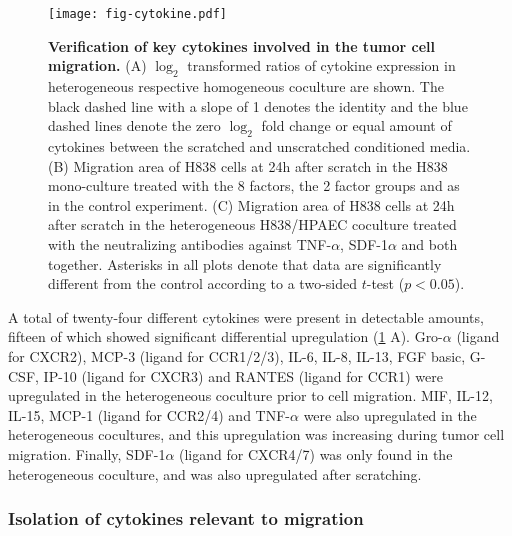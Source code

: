 \begin{figure}
\begin{center}
\texttt{[image: fig-cytokine.pdf]}
\end{center}
\caption[Verification of key cytokines]{
{\bf Verification of key cytokines involved in the tumor cell migration.} 
(A) $\log_2$ transformed ratios of cytokine expression in heterogeneous respective
homogeneous coculture are shown. The black dashed line with a slope of 1 denotes 
the identity and the blue dashed lines denote the zero $\log_2$ fold change
or equal amount of cytokines between the scratched and unscratched conditioned 
media.
(B) Migration area of H838 cells at 24h after scratch in the H838 mono-culture 
treated with the 8
factors, the 2 factor groups and as in the control experiment.
(C) Migration area of H838 cells at 24h after scratch in the heterogeneous 
H838/HPAEC coculture 
treated with the neutralizing antibodies against TNF-$\alpha$, SDF-1$\alpha$
and both together. Asterisks in all plots denote that data are significantly 
different from the control according to a two-sided $t$-test ($p < 0.05$).
}
\label{fig:cytokine}
\end{figure}

A total of twenty-four different cytokines were present in detectable amounts,
fifteen of which showed significant differential upregulation
(\ref{fig:cytokine} A).
Gro-$\alpha$ (ligand for CXCR2), MCP-3 (ligand for CCR1/2/3), IL-6, IL-8, IL-13, FGF basic, G-CSF, IP-10 (ligand for CXCR3) and RANTES (ligand for CCR1) were
upregulated in the heterogeneous coculture prior to cell migration.
MIF, IL-12, IL-15, MCP-1 (ligand for CCR2/4) and TNF-$\alpha$ were also upregulated
in the heterogeneous cocultures, and this upregulation was increasing
during tumor cell migration.
Finally, SDF-1$\alpha$ (ligand for CXCR4/7) was only found in the heterogeneous coculture,
and was also upregulated after scratching. 

\subsubsection{Isolation of cytokines relevant to migration}

